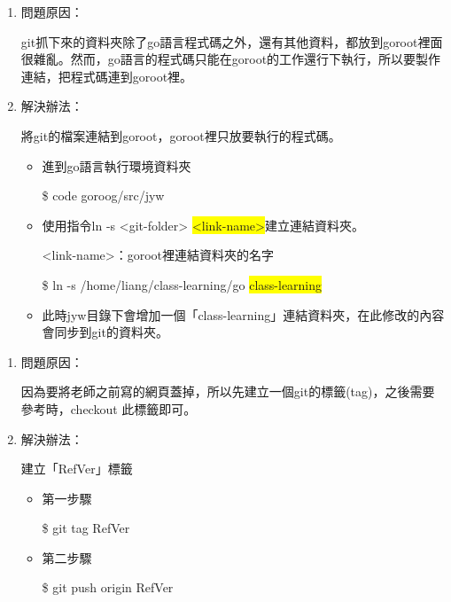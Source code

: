 


\begin{enumerate}
\item 問題原因：

git抓下來的資料夾除了go語言程式碼之外，還有其他資料，都放到goroot裡面很雜亂。然而，go語言的程式碼只能在goroot的工作還行下執行，所以要製作連結，把程式碼連到goroot裡。

\item 解決辦法：

將git的檔案連結到goroot，goroot裡只放要執行的程式碼。
	\begin{itemize}
	\item 進到go語言執行環境資料夾
	
	\colorbox{mygray}{\$ code goroog/src/jyw}
	
	\item 使用指令ln -s <git-folder> \colorbox{yellow}{{\color{blue}<link-name>}}建立連結資料夾。
	
	{\color{blue}<link-name>：goroot裡連結資料夾的名字}
	
	\colorbox{mygray}{\$ ln -s /home/liang/class-learning/go \colorbox{yellow}{class-learning}}
	
	\item 此時jyw目錄下會增加一個「class-learning」連結資料夾，在此修改的內容會同步到git的資料夾。
			
	\end{itemize}
\end{enumerate}



\begin{enumerate}
	\item 問題原因：
	
	因為要將老師之前寫的網頁蓋掉，所以先建立一個git的標籤(tag)，之後需要參考時，checkout 此標籤即可。	
	
	\item 解決辦法：
	
	建立「RefVer」標籤
	\begin{itemize}
		\item 第一步驟
		
		\colorbox{mygray}{\$ git tag RefVer
			}
		
		\item 第二步驟
		
		\colorbox{mygray}{\$ git push origin RefVer}
			
	\end{itemize}
\end{enumerate}

